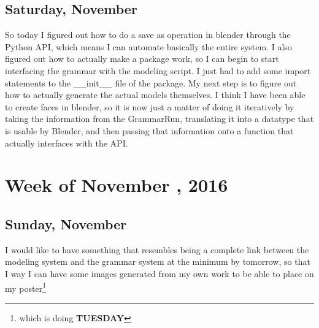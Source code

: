 \documentclass[letterpaper,oneside,titlepage]{article}
\begin{document}
\subsection*{Saturday, November }
So today I figured out how to do a save as operation in blender through the Python API, which means I can automate basically the entire system.  I also figured out how to actually make a package work, so I can begin to start interfacing the grammar with the modeling script.  I just had to add some import statements to the __init__ file of the package.  My next step is to figure out how to actually generate the actual models themselves.  I think I have been able to create faces in blender, so it is now just a matter of doing it iteratively by taking the information from the GrammarRun, translating it into a datatype that is usable by Blender, and then passing that information onto a function that actually interfaces with the API.


\section*{Week of November , 2016}


\subsection*{Sunday, November }
I would like to have something that resembles being a complete link between the modeling system and the grammar system at the minimum by tomorrow, so that I way I can have some images generated from my own work to be able to place on my poster\footnote{which is doing \textbf{TUESDAY}}
\end{document}
